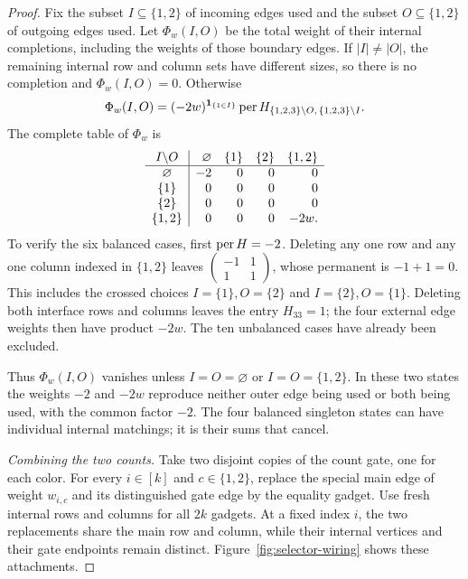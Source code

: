 \begin{proof}
Fix the subset $I\subseteq\{1,2\}$ of incoming edges used and the
subset $O\subseteq\{1,2\}$ of outgoing edges used.  Let $\Phi_w(I,O)$
be the total weight of their internal completions, including the weights
of those boundary edges.  If $|I|\ne|O|$,
the remaining internal row and column sets have different sizes, so
there is no completion and $\Phi_w(I,O)=0$.  Otherwise
\begin{equation}
 \Phi_w(I,O)=(-2w)^{\mathbf1_{\{1\in I\}}}
 \operatorname{per} H_{\{1,2,3\}\setminus O,\,\{1,2,3\}\setminus I}.
 \label{eq:selector-boundary-weight}
\end{equation}
The complete table of $\Phi_w$ is
\begin{equation}
 \begin{array}[t]{c|rrrr}
 I\backslash O&\varnothing&\{1\}&\{2\}&\{1,2\}\\\hline
 \varnothing&-2&0&0&0\\
 \{1\}&0&0&0&0\\
 \{2\}&0&0&0&0\\
 \{1,2\}&0&0&0&-2w.
 \end{array}
 \label{eq:selector-boundary-table}
\end{equation}
To verify the six balanced cases, first $\operatorname{per} H=-2$.  Deleting any one
row and any one column indexed in $\{1,2\}$ leaves
$\left(\begin{smallmatrix}-1&1\\1&1\end{smallmatrix}\right)$, whose
permanent is $-1+1=0$.  This includes the crossed choices
$I=\{1\},O=\{2\}$ and $I=\{2\},O=\{1\}$.  Deleting both interface
rows and columns leaves the entry $H_{33}=1$; the four external edge
weights then have product $-2w$.  The ten unbalanced cases have already
been excluded.

Thus $\Phi_w(I,O)$ vanishes unless $I=O=\varnothing$ or
$I=O=\{1,2\}$.  In these two states the weights $-2$ and $-2w$
reproduce neither outer edge being used or both being used, with the
common factor $-2$.  The four balanced singleton states can have
individual internal matchings; it is their sums that cancel.

\emph{Combining the two counts.}
Take two disjoint copies of the count gate, one for each color.
For every $i\in[k]$ and $c\in\{1,2\}$, replace the special main edge
of weight $w_{i,c}$ and its distinguished gate edge by the equality
gadget.  Use fresh internal rows and columns for all $2k$ gadgets.
At a fixed index $i$, the two replacements share the main row and column,
while their internal vertices and their gate endpoints remain distinct.
Figure~\ref{fig:selector-wiring} shows these attachments.


\end{proof}
